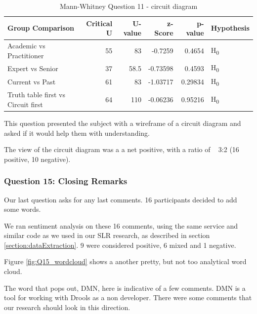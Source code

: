 \begin{table}[H]
    \begin{center}
        \begin{tabular}{ |l ||r |r |r | r|l | } 
            \hline
            Group Comparison                   & Critical U & U-value & z-Score  & p-value & Hypothesis         \\
            \hline
            \hline
            Academic vs Practitioner           & 55         & 83      & -0.7259  & 0.4654  & H\textsubscript{0} \\ 
            \hline
            Expert vs Senior                   & 37         & 58.5    & -0.73598 & 0.4593  & H\textsubscript{0} \\ 
            \hline
            Current vs Past                    & 61         & 83      & -1.03717 & 0.29834 & H\textsubscript{0} \\ 
            \hline
            Truth table first vs Circuit first & 64         & 110     & -0.06236 & 0.95216 & H\textsubscript{0} \\ 
            \hline
        \end{tabular}
    \end{center}
    \caption{Mann-Whitney Question 11 - circuit diagram}
    \label{table:mannwhitneyQ7}
\end{table}

This question presented the subject with a wireframe of a circuit diagram and asked if it would help them with understanding.

The view of the circuit diagram was a a net positive, with a ratio of ~ 3:2 (16 positive, 10 negative).

\subsubsection{Question 15: Closing Remarks}

Our last question asks for any last comments.
16 participants decided to add some words.

We ran sentiment analysis on these 16 comments, using the same service and similar code as we used in our SLR research, as described in section \ref{section:dataExtraction}.
9 were considered positive, 6 mixed and 1 negative.

Figure \ref{fig:Q15_wordcloud} shows a another pretty, but not too analytical word cloud.

The word that pops out, DMN, here is indicative of a few comments.
DMN is a tool for working with Drools as a non developer.
There were some comments that our research should look in this direction.

